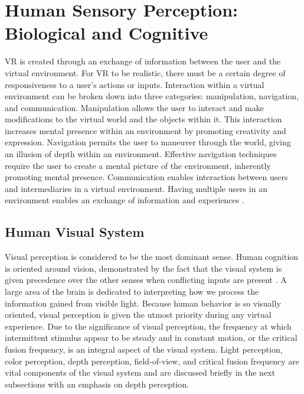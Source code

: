 

\chapter{Human Sensory Perception: Biological and Cognitive}\label{Perception}

 VR is created through an exchange of information between the user and the virtual environment. For VR to be realistic, there must be a certain degree of responsiveness to a user's actions or inputs. Interaction within a virtual environment can be broken down into three categories: manipulation, navigation, and communication. 
 Manipulation allows the user to interact and make modifications to the virtual world and the objects within it. This interaction increases mental presence within an environment by promoting creativity and expression. Navigation permits the user to maneuver through the world, giving an illusion of depth within an environment. Effective navigation techniques require the user to create a mental picture of the environment, inherently promoting mental presence. Communication enables interaction between users and intermediaries in a virtual environment. Having multiple users in an environment enables an exchange of information and experiences \cite{mihelj_apps}.




\section{Human Visual System} \label{sight}


Visual perception is considered to be the most dominant sense. Human cognition is oriented around vision, demonstrated by the fact that the visual system is given precedence over the other senses when conflicting inputs are present \cite{gobbetti}. A large area of the brain is dedicated to interpreting how we process the information gained from visible light. Because human behavior is so visually oriented, visual perception is given the utmost priority during any virtual experience. Due to the significance of visual perception, the frequency at which intermittent stimulus appear to be steady and in constant motion, or the critical fusion frequency, is an integral aspect of the visual system. Light perception, color perception, depth perception, field-of-view, and critical fusion frequency are vital components of the visual system and are discussed briefly in the next subsections with an emphasis on depth perception. 

